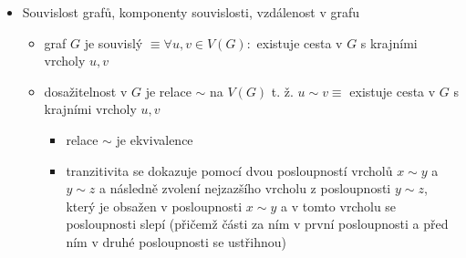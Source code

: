 \begin{itemize}
\begin{itemize}
\begin{itemize}
\end{itemize}
\item úplný bipartitní $K_{m,n}$
\begin{itemize}
\item každý prvek nalevo je spojený s každým napravo
\item prvky na jedné straně mezi sebou nejsou spojeny
\end{itemize}
\item prázdný graf $E_n$
\begin{itemize}
\item $V(E_n):=[n]$
\item $E(E_n) =\emptyset$
\end{itemize}
\item cesta $P_n$
\begin{itemize}
\item $V(P_n):=\{0,\dots, n\}$
\item $E(P_n):=\{\{i,i+1\}\mid 0\leq i \lt n\}$
\item délka cesty se měří v počtu hran
\end{itemize}
\item kružnice/cyklus $C_n$
\begin{itemize}
\item $n\geq 3$
\item $V(C_n):=\{0,\dots, n-1\}$
\item $E(C_n):=\{\{i,(i+1)\bmod n\}\mid 0\leq i \lt n\}$
\end{itemize}
\end{itemize}
\item Souvislost grafů, komponenty souvislosti, vzdálenost v grafu
\begin{itemize}
\item graf $G$ je souvislý $\equiv\forall u,v\in V(G):$ existuje cesta v $G$ s krajními vrcholy $u,v$
\item dosažitelnost v $G$ je relace $\sim$ na $V(G)$ t. ž. $u\sim v\equiv$ existuje cesta v $G$ s krajními vrcholy $u,v$
\begin{itemize}
\item relace $\sim$ je ekvivalence
\item tranzitivita se dokazuje pomocí dvou posloupností vrcholů $x \sim y$ a $y\sim z$ a následně zvolení nejzazšího vrcholu z posloupnosti $y\sim z$, který je obsažen v posloupnosti $x\sim y$ a v tomto vrcholu se posloupnosti slepí (přičemž části za ním v první posloupnosti a před ním v druhé posloupnosti se ustřihnou)
\end{itemize}

\end{itemize}
\end{itemize}
